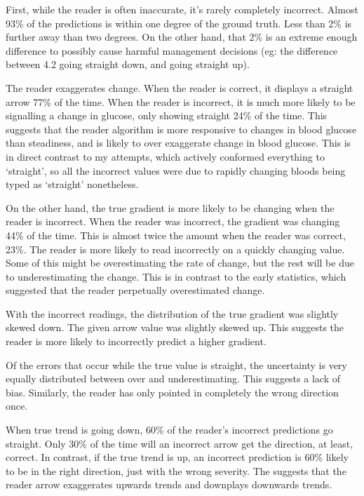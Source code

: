 First, while the reader is often inaccurate, it’s rarely completely incorrect. Almost 93\% of the predictions is within one degree of the ground truth. Less than 2\% is further away than two degrees. On the other hand, that 2\% is an extreme enough difference to possibly cause harmful management decisions (eg: the difference between 4.2 going straight down, and going straight up). 

The reader exaggerates change. When the reader is correct, it displays a straight arrow 77\% of the time. When the reader is incorrect, it is much more likely to be signalling a change in glucose, only showing straight 24\% of the time. This suggests that the reader algorithm is more responsive to changes in blood glucose than steadiness, and is likely to over exaggerate change in blood glucose. This is in direct contrast to my attempts, which actively conformed everything to ‘straight’, so all the incorrect values were due to rapidly changing bloods being typed as ‘straight’ nonetheless.

On the other hand, the true gradient is more likely to be changing when the reader is incorrect. When the reader was incorrect, the gradient was changing 44\% of the time. This is almost twice the amount when the reader was correct, 23\%. The reader is more likely to read incorrectly on a quickly changing value. Some of this might be overestimating the rate of change, but the rest will be due to underestimating the change. This is in contrast to the early statistics, which suggested that the reader perpetually overestimated change.

With the incorrect readings, the distribution of the true gradient was slightly skewed down. The given arrow value was slightly skewed up. This suggests the reader is more likely to incorrectly predict a higher gradient.

Of the errors that occur while the true value is straight, the uncertainty is very equally distributed between over and underestimating. This suggests a lack of bias. Similarly, the reader has only pointed in completely the wrong direction once. 

When true trend is going down, 60\% of the reader’s incorrect predictions go straight. Only 30\% of the time will an incorrect arrow get the direction, at least, correct. In contrast, if the true trend is up, an incorrect prediction is 60\% likely to be in the right direction, just with the wrong severity. The suggests that the reader arrow exaggerates upwards trends and downplays downwards trends.

